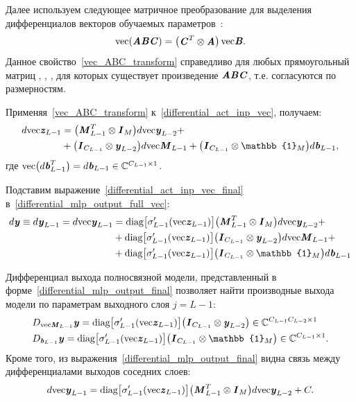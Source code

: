 Далее используем следующее матричное преобразование для выделения дифференциалов векторов обучаемых параметров~\cite{wirt_deriv_book}:
\begin{equation}
	\text{vec}(\textbf{\textit{A}}\textbf{\textit{B}}\textbf{\textit{C}})=
	\begin{pmatrix}
		\textbf{\textit{C}}^T\otimes\textbf{\textit{A}}
	\end{pmatrix}\text{vec}\textbf{\textit{B}}.
	\label{vec_ABC_transform}
\end{equation}
Данное свойство~\eqref{vec_ABC_transform} справедливо для любых прямоугольный матриц , , , для которых существует произведение $\textbf{\textit{A}}\textbf{\textit{B}}\textbf{\textit{C}}$, т.е. согласуются по размерностям.

Применяя~\eqref{vec_ABC_transform} к~\eqref{differential_act_inp_vec}, получаем:
\begin{align}
	d\text{vec}\bit{z}_{L-1}&=
	\big(\bit{M}_{L-1}^T\otimes\bit{I}_{M}\big)d\text{vec}\bit{y}_{L-2}+ \nonumber \\
	&+\big(\bit{I}_{C_{L-1}}\otimes\bit{y}_{L-2}\big)d\text{vec}\bit{M}_{L-1}+
	\big(\bit{I}_{C_{L-1}}\otimes\mathbb{1}_M\big)d\bit{b}_{L-1},
	\label{differential_act_inp_vec_final}
\end{align}
где $\text{vec}\big(d\textbf{\textit{b}}_{L-1}^T\big)=d\textbf{\textit{b}}_{L-1}\in\mathbb{C}^{C_{L-1}\times1}$.

Подставим выражение~\eqref{differential_act_inp_vec_final} в~\eqref{differential_mlp_output_full_vec}:
\begin{align}
	d\bit{y}\equiv d\bit{y}_{L-1}=d\text{vec}\bit{y}_{L-1}&=
	\text{diag}\big[\sigma'_{L-1}(\text{vec}\bit{z}_{L-1})\big]\big(\bit{M}_{L-1}^T\otimes\bit{I}_{M}\big)d\text{vec}\bit{y}_{L-2}+ \nonumber \\
	&+\text{diag}\big[\sigma'_{L-1}(\text{vec}\bit{z}_{L-1})\big]\big(\bit{I}_{C_{L-1}}\otimes\bit{y}_{L-2}\big)d\text{vec}\bit{M}_{L-1}+ \nonumber \\
	&+\text{diag}\big[\sigma'_{L-1}(\text{vec}\bit{z}_{L-1})\big]\big(\bit{I}_{C_{L-1}}\otimes\mathbb{1}_M\big)d\bit{b}_{L-1}
	\label{differential_mlp_output_final}
\end{align}

Дифференциал выхода полносвязной модели, представленный в форме~\eqref{differential_mlp_output_final} позволяет найти производные выхода модели по параметрам выходного слоя $j=L-1$:
\begin{align}
	&D_{\text{vec}\bit{M}_{L-1}}\bit{y}=\text{diag}\big[\sigma'_{L-1}(\text{vec}\bit{z}_{L-1})\big]\big(\bit{I}_{C_{L-1}}\otimes\bit{y}_{L-2}\big)\in\mathbb{C}^{C_{L-1}C_{L-2}\times 1} \nonumber \\
	&D_{\bit{b}_{L-1}}\bit{y}=\text{diag}\big[\sigma'_{L-1}(\text{vec}\bit{z}_{L-1})\big]\big(\bit{I}_{C_{L-1}}\otimes\mathbb{1}_M\big)\in\mathbb{C}^{C_{L-1}\times 1}.
\end{align}
Кроме того, из выражения~\eqref{differential_mlp_output_final} видна связь между дифференциалами выходов соседних слоев:
\begin{equation}
	d\text{vec}\textbf{\textit{y}}_{L-1}=
	\text{diag}\big[\sigma'_{L-1}(\text{vec}\textbf{\textit{z}}_{L-1})\big]\big(\textbf{\textit{M}}_{L-1}^T\otimes\textbf{\textit{I}}_{M}\big)d\text{vec}\textbf{\textit{y}}_{L-2}+C.
	\label{differential_mlp_output_final_diff_relation}
\end{equation}

